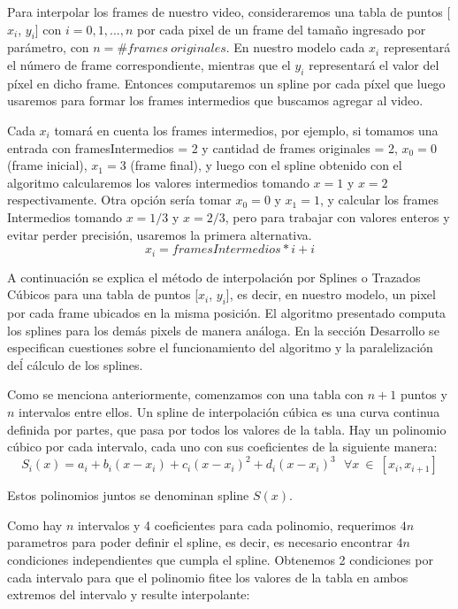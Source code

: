 \par Para interpolar los frames de nuestro video, consideraremos una tabla de puntos [$x_i$, $y_i$] con $i=0,1,...,n$ por cada pixel de un frame del tamaño ingresado por parámetro, con $n=\#frames\ originales$. En nuestro modelo cada $x_{i}$ representará el número de frame correspondiente, mientras que el $y_{i}$ representará el valor del píxel en dicho frame. Entonces computaremos un spline por cada píxel que luego usaremos para formar los frames intermedios que buscamos agregar al video.

\par Cada $x_i$ tomará en cuenta los frames intermedios, por ejemplo, si tomamos una entrada con framesIntermedios = 2 y cantidad de frames originales = 2, $x_0=0$(frame inicial), $x_1=3$ (frame final), y luego con el spline obtenido con el algoritmo calcularemos los valores intermedios tomando $x=1$ y $x=2$ respectivamente. Otra opción sería tomar $x_0=0$ y $x_1=1$, y calcular los frames Intermedios tomando $x=1/3$ y $x=2/3$, pero para trabajar con valores enteros y evitar perder precisión,  usaremos la primera alternativa. 
\begin{equation*}\label{calculo de xi}
x_i = framesIntermedios * i + i
\end{equation*}
\par A continuación se explica el método de interpolación por Splines o Trazados Cúbicos para una tabla de puntos [$x_i$, $y_i$], es decir, en nuestro modelo, un pixel por cada frame ubicados en la misma posición. El algoritmo presentado computa los splines para los demás pixels de manera análoga. En la sección Desarrollo se especifican cuestiones sobre el funcionamiento del algoritmo y la paralelización deĺ cálculo de los splines.
\par Como se menciona anteriormente, comenzamos con una tabla con $n+1$ puntos y $n$ intervalos entre ellos. Un spline de interpolación cúbica es una curva continua definida por partes, que pasa por todos los valores de la tabla. Hay un polinomio cúbico por cada intervalo, cada uno con sus coeficientes de la siguiente manera:
\begin{equation*}\label{splines}
S_i(x) = a_i + b_i(x-x_i) + c_i(x-x_i)^2 + d_i(x-x_i)^3 \ \ \ \forall x\ \in\ [x_i, x_{i+1}]
\end{equation*}
\par Estos polinomios juntos se denominan spline $S(x)$.
\par Como hay $n$ intervalos y 4 coeficientes para cada polinomio, requerimos $4n$ parametros para poder definir el spline, es decir, es necesario encontrar $4n$ condiciones independientes que cumpla el spline. Obtenemos 2 condiciones por cada intervalo para que el polinomio fitee los valores de la tabla en ambos extremos del intervalo y resulte interpolante:
